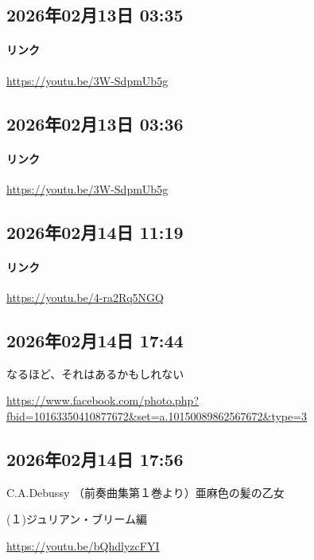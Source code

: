 \subsection*{2026年02月13日 03:35}

\paragraph{リンク}
\url{https://youtu.be/3W-SdpmUb5g}

\subsection*{2026年02月13日 03:36}

\paragraph{リンク}
\url{https://youtu.be/3W-SdpmUb5g}

\subsection*{2026年02月14日 11:19}

\paragraph{リンク}
\url{https://youtu.be/4-ra2Rq5NGQ}

\subsection*{2026年02月14日 17:44}

なるほど、それはあるかもしれない

\url{https://www.facebook.com/photo.php?fbid=10163350410877672&set=a.10150089862567672&type=3}

\subsection*{2026年02月14日 17:56}

C.A.Debussy （前奏曲集第１巻より）亜麻色の髪の乙女

(１)ジュリアン・ブリーム編

\url{https://youtu.be/bQhdlyzcFYI}


